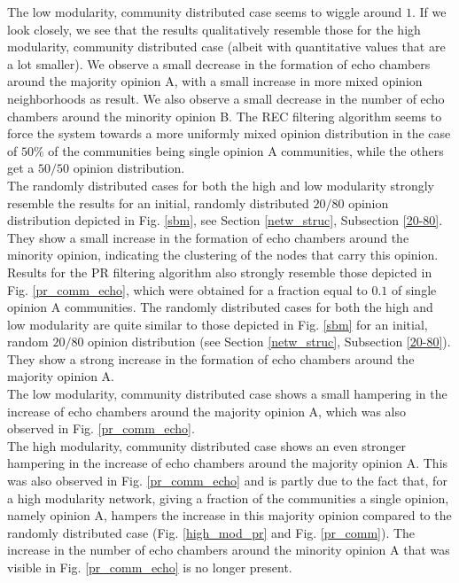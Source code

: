 \documentclass[11 pt , letterpaper , twoside , openright]{book}
\begin{document}
\newline
The low modularity, community distributed case seems to wiggle around $1$. If we look closely, we see that the results qualitatively resemble those for the high modularity, community distributed case (albeit with quantitative values that are a lot smaller). We observe a small decrease in the formation of echo chambers around the majority opinion A, with a small increase in more mixed opinion neighborhoods as result. We also observe a small decrease in the number of echo chambers around the minority opinion B. The REC filtering algorithm seems to force the system towards a more uniformly mixed opinion distribution in the case of $50 \%$ of the communities being single opinion A communities, while the others get a $50/50$ opinion distribution.\\
\newline
The randomly distributed cases for both the high and low modularity strongly resemble the results for an initial, randomly distributed $20/80$ opinion distribution depicted in Fig. \ref{sbm}, see Section \ref{netw_struc}, Subsection \ref{20-80}. They show a small increase in the formation of echo chambers around the minority opinion, indicating the clustering of the nodes that carry this opinion.\\
\newline
Results for the PR filtering algorithm also strongly resemble those depicted in Fig. \ref{pr_comm_echo}, which were obtained for a fraction equal to $0.1$ of single opinion A communities. The randomly distributed cases for both the high and low modularity are quite similar to those depicted in Fig. \ref{sbm} for an initial, random $20/80$ opinion distribution (see Section \ref{netw_struc}, Subsection \ref{20-80}). They show a strong increase in the formation of echo chambers around the majority opinion A.\\
\newline
The low modularity, community distributed case shows a small hampering in the increase of echo chambers around the majority opinion A, which was also observed in Fig. \ref{pr_comm_echo}.\\
\newline
The high modularity, community distributed case shows an even stronger hampering in the increase of echo chambers around the majority opinion A. This was also observed in Fig. \ref{pr_comm_echo} and is partly due to the fact that, for a high modularity network, giving a fraction of the communities a single opinion, namely opinion A, hampers the increase in this majority opinion compared to the randomly distributed case (Fig. \ref{high_mod_pr} and Fig. \ref{pr_comm}). The increase in the number of echo chambers around the minority opinion A that was visible in Fig. \ref{pr_comm_echo} is no longer present.
\end{document}
